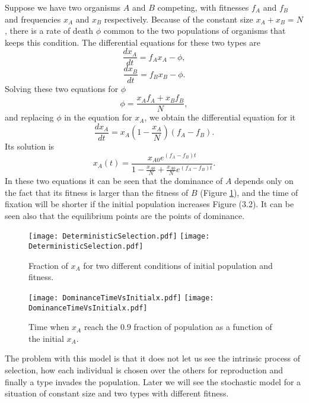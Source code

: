  Suppose we have two organisms $A$ and $B$ competing, with fitnesses $f_{A}$ and $f_{B}$ and frequencies $x_A$ and $x_B$ respectively. Because of the constant size $x_A+x_B=N$, there is a rate of death $\phi$ common to the two populations of organisms that keeps this condition. The differential equations for these two types are
 \begin{equation}
 \frac{dx_A}{dt} =f_A x_{A} - \phi,
 \end{equation}  
  \begin{equation}
 \frac{dx_B}{dt} =f_B x_{B} - \phi.
 \end{equation}  
 Solving these two equations for $\phi$
 \begin{equation}
 \phi = \frac{x_{A}f_{A}+x_{B}f_{B}}{N},
 \end{equation}
 and replacing $\phi$ in the equation for $x_{A}$, we obtain the differential equation for it
 \begin{equation}\label{3.12}
\frac{dx_{A}}{dt}=x_{A}(1-\frac{x_{A}}{N})(f_{A}-f_{B}).
 \end{equation} 
Its solution is 
\begin{equation}
x_{A}(t)=\frac{x_{A0}e^{(f_{A}-f_{B})t}}{1-\frac{x_{A0}}{N}+\frac{x_{A0}}{N}e^{(f_{A}-f_{B})t}}.
\end{equation}  
In these two equations it can be seen that the dominance of $A$ depends only on the fact that its fitness is larger than the fitness of $B$  (Figure \ref{Fig3.1}), and the time of fixation will be shorter if the initial population increases Figure (3.2). It can be seen also that the equilibrium points are the points of dominance. 
\begin{figure}[H]
  \begin{center}
    \leavevmode
    \ifpdf
      \texttt{[image: DeterministicSelection.pdf]}
    \else
      \texttt{[image: DeterministicSelection.pdf]}
    \fi
    \caption{Fraction of $x_{A}$ for two different conditions of initial population and fitness.}
    \label{Fig3.1}
  \end{center}
  \end{figure}
  
\begin{figure}[H]
  \begin{center}
    \leavevmode
    \ifpdf
      \texttt{[image: DominanceTimeVsInitialx.pdf]}
    \else
      \texttt{[image: DominanceTimeVsInitialx.pdf]}
    \fi
    \caption{Time when $x_{A}$ reach the $0.9$ fraction of population as a function of the initial $x_{A}$.}
    \label{FigAir2}
  \end{center}
\end{figure}

The problem with this model is that it does not let us  see the intrinsic process of selection, how each individual is chosen over the others for reproduction and finally a type invades the population. Later we will see the stochastic model for a situation of constant size and two types with different fitness.  

